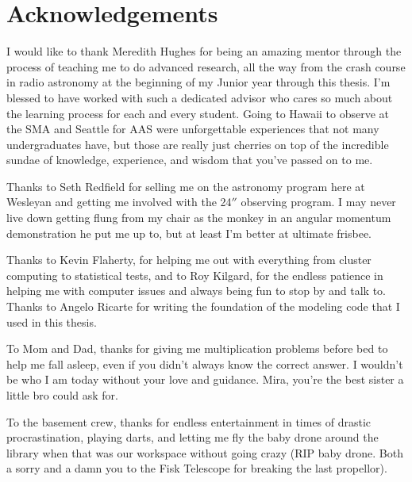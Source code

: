\chapter{Acknowledgements}

I would like to thank Meredith Hughes for being an amazing mentor through the process of teaching me to do advanced research, all the way from the crash course in radio astronomy at the beginning of my Junior year through this thesis. I'm blessed to have worked with such a dedicated advisor who cares so much about the learning process for each and every student. Going to Hawaii to observe at the SMA and Seattle for AAS were unforgettable experiences that not many undergraduates have, but those are really just cherries on top of the incredible sundae of knowledge, experience, and wisdom that you've passed on to me. 

Thanks to Seth Redfield for selling me on the astronomy program here at Wesleyan and getting me involved with the 24$''$ observing program. I may never live down getting flung from my chair as the monkey in an angular momentum demonstration he put me up to, but at least I'm better at ultimate frisbee. 

Thanks to Kevin Flaherty, for helping me out with everything from cluster computing to statistical tests, and to Roy Kilgard, for the endless patience in helping me with computer issues and always being fun to stop by and talk to. Thanks to Angelo Ricarte for writing the foundation of the modeling code that I used in this thesis. 

To Mom and Dad, thanks for giving me multiplication problems before bed to help me fall asleep, even if you didn't always know the correct answer. I wouldn't be who I am today without your love and guidance. Mira, you're the best sister a little bro could ask for. 

To the basement crew, thanks for endless entertainment in times of drastic procrastination, playing darts, and letting me fly the baby drone around the library when that was our workspace without going crazy (RIP baby drone. Both a sorry and a damn you to the Fisk Telescope for breaking the last propellor). 

